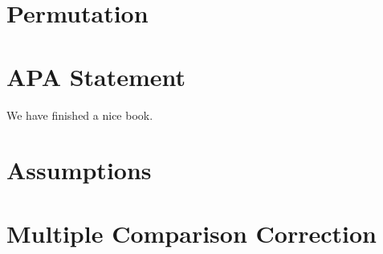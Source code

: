 \documentclass[]{book}
\begin{document}
\hypertarget{permutation}{%
\chapter{Permutation}\label{permutation}}

\hypertarget{apa-statement}{%
\chapter{APA Statement}\label{apa-statement}}

We have finished a nice book.

\hypertarget{assumptions}{%
\chapter{Assumptions}\label{assumptions}}

\hypertarget{multiple-comparison-correction}{%
\chapter{Multiple Comparison Correction}\label{multiple-comparison-correction}}


\end{document}
